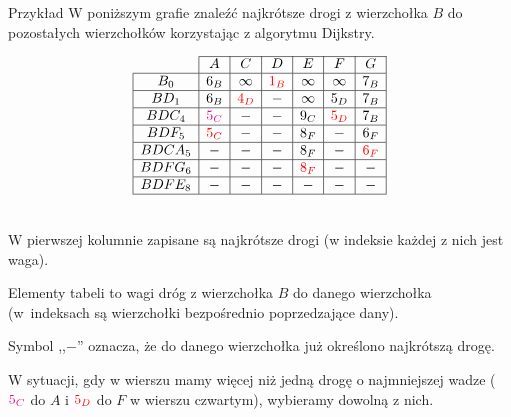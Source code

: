 \documentclass[a4paper,10pt]{beamer}
\begin{document}
\begin{frame}
	
	\begin{exampleblock}{Przykład}
		W poniższym grafie znaleźć najkrótsze drogi z wierzchołka $B$ do pozostałych wierzchołków korzystając z algorytmu Dijkstry.
		
		\begin{minipage}{.45\textwidth}
			\begin{center}
				
			\end{center}
		\end{minipage}
		\begin{minipage}{.45\textwidth}
				$$\begin{array}{|c|c|c|c|c|c|c|}\cline{2-7}			
					\multicolumn{1}{c|}{}&A&C&D&E&F&G\\\hline
					B_0&6_B&\infty&\textcolor{red}{1_B}&\infty&\infty&7_B\\\hline
					BD_1&6_B&\textcolor{red}{4_D}&-&\infty&5_D&7_B\\\hline
					BDC_4&\textcolor{magenta}{5_C}&-&-&9_C&\textcolor{red}{5_D}&7_B\\\hline
					BDF_5&\textcolor{red}{5_C}&-&-&8_F&-&6_F\\\hline
					BDCA_5&-&-&-&8_F&-&\textcolor{red}{6_F}\\\hline
					BDFG_6&-&-&-&\textcolor{red}{8_F}&-&-\\\hline
					BDFE_8&-&-&-&-&-&-\\\hline
				\end{array}$$
		\end{minipage}\\
	\vspace{0.3cm}
	W pierwszej kolumnie zapisane są najkrótsze drogi (w indeksie każdej z nich jest waga).
	
	Elementy tabeli to wagi dróg z wierzchołka $B$ do danego wierzchołka (w~indeksach są wierzchołki bezpośrednio poprzedzające dany).
	
	Symbol ,,$-$'' oznacza, że do danego wierzchołka już określono najkrótszą drogę.
	
	W sytuacji, gdy w wierszu mamy więcej niż jedną drogę o najmniejszej wadze ($\textcolor{magenta}{5_C}$ do $A$ i $\textcolor{red}{5_D}$ do $F$ w wierszu czwartym), wybieramy dowolną z nich.
		
	\end{exampleblock}
	
\end{frame}
\end{document}
